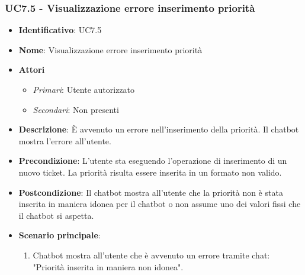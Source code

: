 \subsubsection{UC7.5 - Visualizzazione errore inserimento priorità}
\begin{itemize}
	\item \textbf{Identificativo}: UC7.5
	\item \textbf{Nome}:  Visualizzazione errore inserimento priorità
	\item \textbf{Attori}
	\begin{itemize} 
		\item \textit{Primari}: Utente autorizzato
		\item \textit{Secondari}: Non presenti
	\end{itemize}
	\item \textbf{Descrizione}: È avvenuto un errore nell'inserimento della priorità. Il chatbot mostra l'errore all'utente.
	\item \textbf{Precondizione}: L'utente sta eseguendo l'operazione di inserimento di un nuovo ticket. La priorità risulta essere inserita in un formato non valido. 
	\item \textbf{Postcondizione}: Il chatbot mostra all'utente che la priorità non è stata inserita in maniera idonea per il chatbot o non assume uno dei valori fissi che il chatbot si aspetta.
	\item \textbf{Scenario principale}: \begin{enumerate}
		\item Chatbot mostra all'utente che è avvenuto un errore tramite chat: "Priorità inserita in maniera non idonea".
	\end{enumerate}
\end{itemize}
\newpage